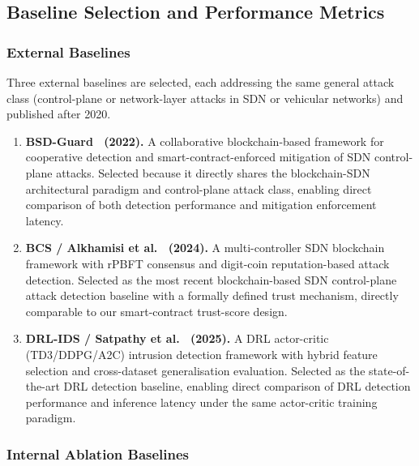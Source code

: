 \subsection{Baseline Selection and Performance Metrics}
\label{sec:baselines}

\subsubsection{External Baselines}

Three external baselines are selected, each addressing the same
general attack class (control-plane or network-layer attacks in
SDN or vehicular networks) and published after 2020.

\begin{enumerate}

\item \textbf{BSD-Guard~\cite{jiang2022bsdguard} (2022).}
A collaborative blockchain-based framework for cooperative
detection and smart-contract-enforced mitigation of SDN control-plane
attacks. Selected because it directly shares the blockchain-SDN
architectural paradigm and control-plane attack class, enabling
direct comparison of both detection performance and mitigation
enforcement latency.

\item \textbf{BCS / Alkhamisi et al.~\cite{alkhamisi2024bcs}
(2024).} A multi-controller SDN blockchain framework with rPBFT
consensus and digit-coin reputation-based attack detection.
Selected as the most recent blockchain-based SDN control-plane
attack detection baseline with a formally defined trust mechanism,
directly comparable to our smart-contract trust-score design.

\item \textbf{DRL-IDS / Satpathy et al.~\cite{satpathy2025cloud}
(2025).} A DRL actor-critic (TD3/DDPG/A2C) intrusion detection
framework with hybrid feature selection and cross-dataset
generalisation evaluation. Selected as the state-of-the-art
DRL detection baseline, enabling direct comparison of DRL
detection performance and inference latency under the same
actor-critic training paradigm.

\end{enumerate}

\subsubsection{Internal Ablation Baselines}

